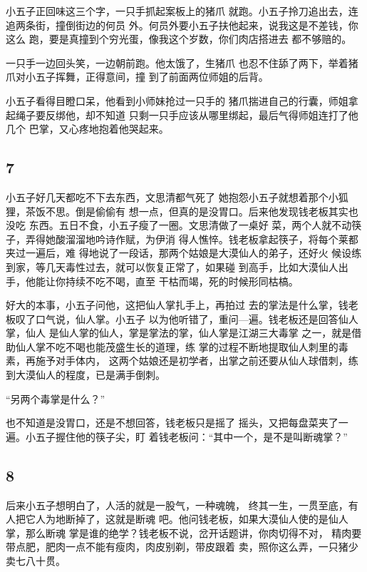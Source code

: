 小五子正回味这三个字，一只手抓起案板上的猪爪
就跑。小五子拎刀追出去，连追两条街，撞倒街边的何员
外。何员外要小五子扶他起来，说我这是不差钱，你这么
跑，要是真撞到个穷光蛋，像我这个岁数，你们肉店搭进去
都不够赔的。

一只手一边回头笑，一边朝前跑。他太饿了，生猪爪
也忍不住舔了两下，举着猪爪对小五子挥舞，正得意间，撞
到了前面两位师姐的后背。

小五子看得目瞪口呆，他看到小师妹抢过一只手的
猪爪揣进自己的行囊，师姐拿起绳子要反绑他，却不知道
只剩一只手应该从哪里绑起，最后气得师姐连打了他几个
巴掌，又心疼地抱着他哭起来。
\newline

{\centering\subsection{7}}

小五子好几天都吃不下去东西，文思清都气死了
她抱怨小五子就想着那个小狐狸，茶饭不思。倒是偷偷有
想一点，但真的是没胃口。后来他发现钱老板其实也没吃
东西。五日不食，小五子瘦了一圈。文思清做了一桌好
菜，两个人就不动筷子，弄得她酸溜溜地吟诗作赋，为伊消
得人憔悴。钱老板拿起筷子，将每个莱都夹过一遍后，难
得地说了一段话，那两个姑娘是大漠仙人的弟子，还好火
候设练到家，等几天毒性过去，就可以恢复正常了，如果碰
到高手，比如大漠仙人出手，他能让你持续不吃不喝，直至
干枯而竭，死的时候形同枯槁。

好大的本事，小五子问他，这把仙人掌扎手上，再拍过
去的掌法是什么掌，钱老板叹了口气说，仙人掌。小五子
以为他听错了，重问—遍。钱老板还是回答仙人掌，仙人
是仙人掌的仙人，掌是掌法的掌，仙人掌是江湖三大毒掌
之一，就是借助仙人掌不吃不喝也能茂盛生长的道理，练
掌的过程不断地提取仙人刺里的毒素，再施予对手体内，
这两个姑娘还是初学者，出掌之前还要从仙人球借刺，练
到大漠仙人的程度，已是满手倒刺。

“另两个毒掌是什么？”

也不知道是没胃口，还是不想回答，钱老板只是摇了
摇头，又把每盘菜夹了一遍。小五子握住他的筷子尖，盯
着钱老板问：“其中一个，是不是叫断魂掌？”
\newline

{\centering\subsection{8}}

后来小五子想明白了，人活的就是一股气，一种魂魄，
终其一生，一贯至底，有人把它人为地断掉了，这就是断魂
吧。他问钱老板，如果大漠仙人使的是仙人掌，那么断魂
掌是谁的绝学？钱老板不说，岔开话题讲，你肉切得不对，
精肉要带点肥，肥肉一点不能有瘦肉，肉皮别剃，带皮跟着
卖，照你这么弄，一只猪少卖七八十贯。

